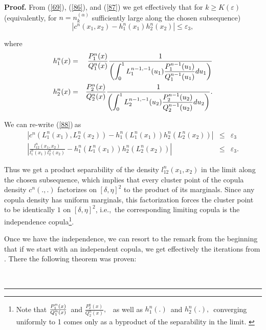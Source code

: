 \documentclass[onecolumn]{article}
\providecommand{\dint}{\displaystyle\int}
\newenvironment{proof}[1][Proof]{\noindent\textbf{#1.} }{\ \rule{0.5em}{0.5em}}
\renewcommand{\dint}{\displaystyle\int}
\begin{document}
\begin{proof}
From (\ref{69}), (\ref{86}), and (\ref{87}) we get effectively that for $%
k\geq K(\varepsilon )$ (equivalently, for $n=n_{k}^{(\alpha )}$ sufficiently
large along the chosen subsequence)%
\begin{equation}
\left\vert c^{n}(x_{1},x_{2})-h_{1}^{n}(x_{1})h_{2}^{n}(x_{2})\right\vert
\leq \varepsilon _{3},  \label{88}
\end{equation}

where%
\begin{eqnarray}
h_{1}^{n}(x) &=&\frac{P_{1}^{n}(x)}{Q_{1}^{n}(x)}\frac{1}{\left(
\dint\nolimits_{0}^{1}L_{1}^{n-1,-1}(u_{1})\frac{P_{1}^{n-1}(u_{1})}{%
Q_{1}^{n-1}(u_{1})}du_{1}\right) }  \label{89} \\
h_{2}^{n}(x) &=&\frac{P_{2}^{n}(x)}{Q_{2}^{n}(x)}\frac{1}{\left(
\dint\nolimits_{0}^{1}L_{2}^{n-1,-1}(u_{2})\frac{P_{2}^{n-1}(u_{2})}{%
Q_{2}^{n-1}(u_{2})}du_{2}\right) }.  \label{90}
\end{eqnarray}

We can re-write (\ref{88})$~$as%
\begin{eqnarray}
\left\vert
c^{n}(L_{1}^{n}(x_{1}),L_{2}^{n}(x_{2}))-h_{1}^{n}(L_{1}^{n}(x_{1}))h_{2}^{n}(L_{2}^{n}(x_{2}))\right\vert &\leq &\varepsilon _{3}
\label{101} \\
\left\vert \frac{l_{12}^{n}(x_{1},x_{2})}{l_{1}^{n}(x_{1})l_{2}^{n}(x_{2})}%
-h_{1}^{n}(L_{1}^{n}(x_{1}))h_{2}^{n}(L_{2}^{n}(x_{2}))\right\vert &\leq
&\varepsilon _{3}.  \label{102}
\end{eqnarray}

Thus we get a product separability of the density $l_{12}^{n}(x_{1},x_{2})$
in the limit along the chosen subsequence, which implies that every cluster
point of the copula density $c^{n}(.,.)$ factorizes on $[\delta ,\eta ]^{2}$
to the product of its marginals. Since any copula density has uniform
marginals, this factorization forces the cluster point to be identically $1$
on $[\delta ,\eta ]^{2}$, i.e.,\ the corresponding limiting copula is the
independence copula\footnote{{\footnotesize Note that }$\frac{P_{1}^{n}(x)}{%
Q_{1}^{n}(x)}${\footnotesize \ and }$\frac{P_{2}^{n}(x)}{Q_{2}^{n}(x)},$%
{\footnotesize \ as well as }$h_{1}^{n}(.)${\footnotesize \ and }$%
h_{2}^{n}(.),${\footnotesize \ converging uniformly to 1 comes only as a
byproduct of the separability in the limit. }}.

Once we have the independence, we can resort to the remark from the
beginning that if we start with an independent copula, we get effectively
the iterations from \cite{[3]}. There the following theorem was proven:


\end{proof}
\end{document}
